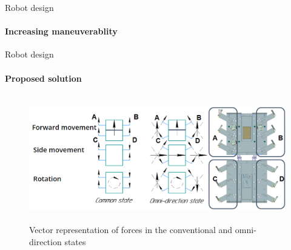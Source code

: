 \documentclass[aspectratio=169]{beamer}
\begin{document}
\begin{frame}[t]{Robot design}
    \framesubtitle{Increasing maneuverablity}
\end{frame}

\begin{frame}[t]{Robot design}
    \framesubtitle{Proposed solution}
    \vspace{-0.7cm}
    \begin{figure}[H]
        \centering\includegraphics[height=5.5cm,width=1\textwidth,keepaspectratio]{omni_rot.png}
        \caption*{Vector representation of forces in  the conventional and omni-direction states}
    \end{figure}
\end{frame}
\end{document}
